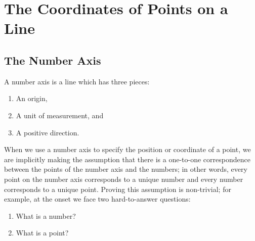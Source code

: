 \documentclass{tufte-book} %
\newcommand{\doccls}[1]{\texttt{#1}}
\begin{document}

%


\mainmatter


\chapter{The Coordinates of Points on a Line}

\section{The Number Axis}
A number axis is a line which has three pieces:
\begin{enumerate}
	\item An origin,
	\item A unit of measurement, and
	\item A positive direction.
\end{enumerate}

When we use a number axis to specify the position or coordinate of a point, we are implicitly making the assumption that there is a one-to-one correspondence between the points of the number axis and the numbers; in other words, every point on the number axis corresponds to a unique number and every number corresponds to a unique point. Proving this assumption is non-trivial; for example, at the onset we face two hard-to-answer questions:
\begin{enumerate}
	\item What is a number?
	\item What is a point?
\end{enumerate} 
\end{document}
